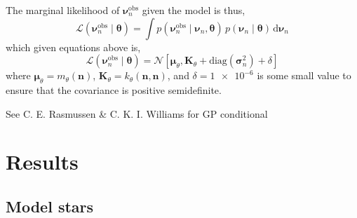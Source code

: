 \documentclass[linenumbers,modern,astrosymb,times]{aastex631dm}
\newcommand{\npred}{n_{\star}}
\newcommand{\dd}{\mathrm{d}}
\begin{document}
The marginal likelihood of \(\bm\nu^\mathrm{obs}_n\) given the model is thus,
%
\begin{equation}
    \mathcal{L}(\bm\nu^\mathrm{obs}_n \mid \bm\theta)
    = \int p(\bm\nu^\mathrm{obs}_n \mid \bm \nu_n, \bm\theta)
    \, p(\bm \nu_n \mid \bm\theta) \, \dd \bm \nu_n
\end{equation}
%
which given equations above is,
%
\begin{equation}
    \mathcal{L}(\bm\nu^\mathrm{obs}_n \mid \bm\theta) = \mathcal{N}\left[
        \bm\mu_\theta, \bm K_\theta
        + \mathrm{diag}(\bm\sigma_n^2) + \delta
        \right]
\end{equation}
%
where \(\bm\mu_\theta = m_\theta(\bm n)\), \(\bm K_\theta = k_\theta(\bm n, \bm n)\), and
\(\delta = \num{1e-6}\) is some small value to ensure that the covariance is
positive semidefinite.

See C. E. Rasmussen \& C. K. I. Williams for GP conditional
%


\section{Results}\label{sec:results}




\subsection{Model stars}\label{sec:model-stars}
\end{document}
